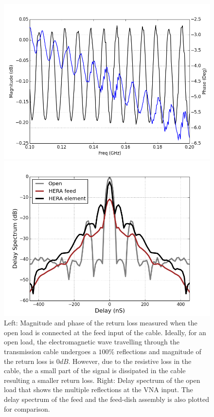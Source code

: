 \documentclass[twocolumn]{emulateapj}
\begin{document}
\begin{figure}[ht]
\begin{minipage}[b]{0.5\linewidth}
\centering
\includegraphics[angle=0, width=\linewidth]{plots/open_RL.png}
\end{minipage}
\hspace{0.1cm}
\begin{minipage}[b]{0.5\linewidth}
\centering
\includegraphics[angle=0, width=\linewidth]{GB_reflectometry_part3/plot/open_delay.png}
\end{minipage}
\caption{Left: Magnitude and phase of the return loss measured when the open load is connected at the feed input of the cable. Ideally, for an open load, the electromagnetic wave travelling through the transmission cable undergoes a $100\%$ reflections and magnitude of the return loss is $0dB$. However, due to the resistive loss in the cable, the a small part of the signal is dissipated in the cable resulting a smaller return loss.  Right: Delay spectrum of the open load that shows the multiple reflections at the VNA input. The delay spectrum of the feed and the feed-dish assembly is also plotted for comparison.}
\label{fig:open_RL}       
\end{figure}
\end{document}
